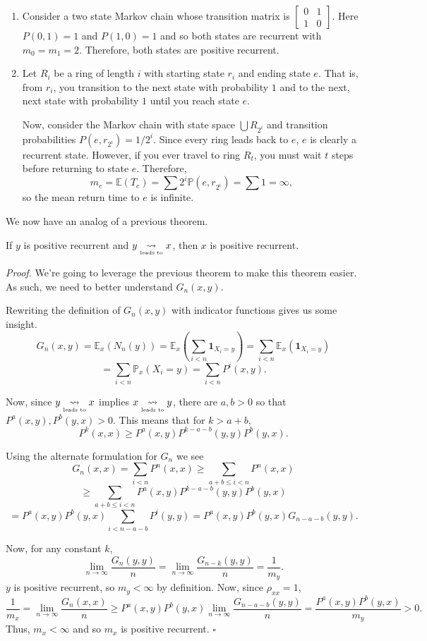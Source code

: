 \documentclass{problemset}
\newcommand{\E}{\mathbb{E}}
\newcommand{\mat}[1]{\begin{bmatrix}#1\end{bmatrix}}
\newcommand{\1}{\mathbf{1}}
\renewcommand{\P}{\mathbb{P}}
\newcommand{\ldsto}{\underset{\text{\tiny leads to}}{\leadsto}}
\newenvironment{proof}{\emph{Proof.}}{\hfill$\square$}
\begin{document}
	\begin{enumerate}
		\item Consider a two state Markov chain whose transition matrix is $\mat{0&1\\1&0}$.  
			Here $P(0,1)=1$ and $P(1,0)=1$ and so both states are recurrent
			with $m_0=m_1=2$.  Therefore, both states are positive recurrent.
		\item Let $R_i$ be a ring of length $i$ with starting state $r_i$ and ending state
			$e$.  That is, from $r_i$, you transition to the next state with probability
			$1$ and to the next, next state with probability $1$ until you reach state $e$.

			Now, consider the Markov chain with state space $\bigcup R_{2^i}$ and transition
			probabilities $P(e,r_{2^i}) = 1/2^i$.  Since every ring leads back to $e$, $e$
			is clearly a recurrent state.  However, if you ever travel to ring $R_t$, you
			must wait $t$ steps before returning to state $e$.  Therefore, 
			\[
				m_e= \E(T_e) = \sum 2^i \P(e,r_{2^i}) = \sum 1 = \infty,
			\]
			so the mean return time to $e$ is infinite.
	\end{enumerate}

	We now have an analog of a previous theorem.

	\begin{theorem}
		If $y$ is positive recurrent and $y\ldsto x$, then $x$ is positive recurrent.
	\end{theorem}

	\begin{proof}
		We're going to leverage the previous theorem to make this theorem easier.  As such,
		we need to better understand $G_n(x,y)$.

		Rewriting the definition of $G_n(x,y)$ with indicator functions gives
		us some insight.
		\[
			G_n(x,y) = \E_x(N_n(y)) = \E_x\left(\sum_{i<n} \1_{X_i=y}\right) = \sum_{i<n} \E_x(\1_{X_i=y})
		\]
		\[
			=\sum_{i<n} \P_x(X_i=y) = \sum_{i<n} P^i(x,y).
		\]

		Now, since $y\ldsto x$ implies $x\ldsto y$, there are $a,b>0$ so that $P^a(x,y),P^b(y,x)>0$.
		This means that for $k>a+b$, 
		\[
			P^k(x,x) \geq P^a(x,y)P^{k-a-b}(y,y)P^b(y,x).
		\]

		Using the alternate formulation for $G_n$ we see
		\[
			G_n(x,x) = \sum_{i<n} P^n(x,x) \geq \sum_{a+b\leq i<n} P^n(x,x)
		\]\[
			\geq \sum_{a+b\leq i<n}P^a(x,y)P^{k-a-b}(y,y)P^b(y,x)
		\]
		\[
			=P^a(x,y)P^b(y,x) \sum_{i<n-a-b} P^{i}(y,y)
			=P^a(x,y)P^b(y,x) G_{n-a-b}(y,y).
		\]

		Now, for any constant $k$, 
		\[
			\lim_{n\to\infty} \frac{G_n(y,y)}{n}=\lim_{n\to\infty} \frac{G_{n-k}(y,y)}{n} = \frac{1}{m_y}.
		\]
		$y$ is positive recurrent, so $m_y<\infty$ by definition.  Now, since $\rho_{xx}=1$,
		\[
			\frac{1}{m_x} = \lim_{n\to\infty} \frac{G_n(x,x)}{n} \geq 
			P^a(x,y)P^b(y,x) \lim_{n\to\infty}\frac{G_{n-a-b}(y,y)}{n} = \frac{P^a(x,y)P^b(y,x)}{m_y}>0.
		\]
		Thus, $m_x<\infty$ and so $m_x$ is positive recurrent.
	\end{proof}
\end{document}
